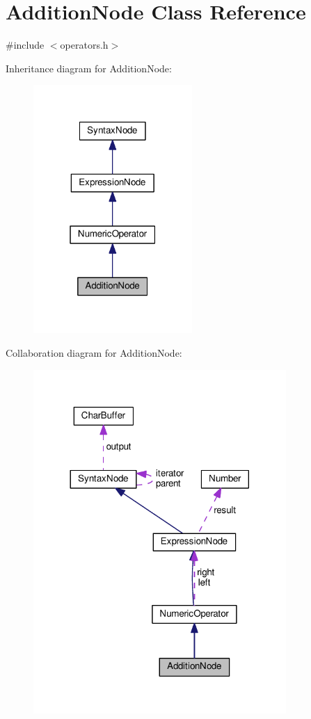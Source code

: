 \hypertarget{classAdditionNode}{}\section{Addition\+Node Class Reference}
\label{classAdditionNode}


{\ttfamily \#include $<$operators.\+h$>$}



Inheritance diagram for Addition\+Node\+:\nopagebreak
\begin{figure}[H]
\begin{center}
\leavevmode
\includegraphics[width=171pt]{classAdditionNode__inherit__graph}
\end{center}
\end{figure}


Collaboration diagram for Addition\+Node\+:\nopagebreak
\begin{figure}[H]
\begin{center}
\leavevmode
\includegraphics[width=272pt]{classAdditionNode__coll__graph}
\end{center}
\end{figure}
